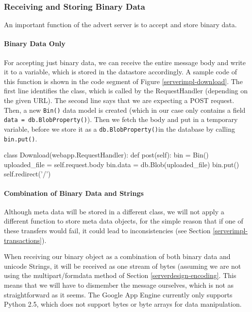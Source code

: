 \subsubsection{Receiving and Storing Binary Data}
An important function of the advert server is to accept and store binary data.

\paragraph{Binary Data Only}
For accepting just binary data, we can receive the entire message body and write
it to a variable, which is stored in the datastore accordingly. A sample code of
this function is shown in the code segment of Figure \ref{serverimpl-download}.
The first line identifies the class, which is called by the RequestHandler
(depending on the given URL). The second line says that we are expecting a POST
request. Then, a new \texttt{Bin()} data model is created (which in our case only
contains a field \texttt{data = db.BlobProperty()}). Then we fetch the body and
put in a temporary variable, before we store it as a \texttt{db.BlobProperty()}in
the database by calling \texttt{bin.put()}.

\begin{figure*}[ht] %
\begin{center}
\begin{code}
class Download(webapp.RequestHandler):
  def post(self):
    bin = Bin()
    uploaded_file = self.request.body
    bin.data = db.Blob(uploaded_file)
    bin.put()
    self.redirect('/')
\end{code}
\caption{Accepting Binary Data.\label{serverimpl-download}}
\end{center}
\end{figure*}
      
\paragraph{Combination of Binary Data and Strings}
Although meta data will be stored in a different class, we will not apply a
different function to store meta data objects, for the simple reason that if one
of these transfers would fail, it could lead to inconsistencies (see Section
\ref{serverimpl-transactions}).

When receiving our binary object as a combination of both binary data and
unicode Strings, it will be received as one stream of bytes (assuming we are not
using the multipart/formdata method of Section \ref{serverdesign-encoding}.
This means that we will have to dismember the message ourselves, which is
not as straightforward as it seems. The Google App Engine currently only
supports Python 2.5, which does not support bytes or byte arrays for data
manipulation.

